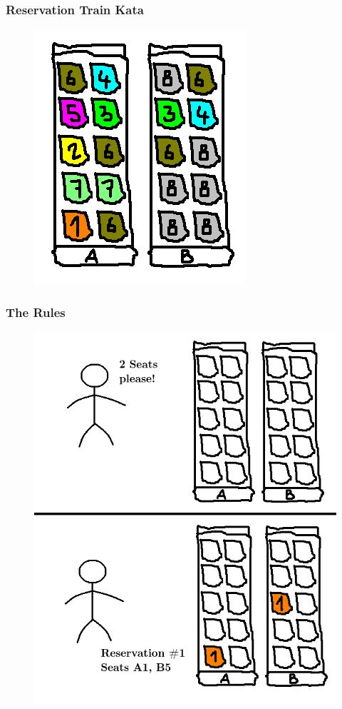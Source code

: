 \documentclass{beamer}
\begin{document}
\begin{frame}
  \frametitle{Reservation Train Kata}
  \begin{figure}
    \includegraphics[scale=0.7]{tla-introduction/other-configuration}
  \end{figure}
\end{frame}

\begin{frame}
  \frametitle{The Rules}
  \begin{figure}
    \includegraphics[scale=0.4]{tla-introduction/client-reserving}
  \end{figure}
\end{frame}
\end{document}
